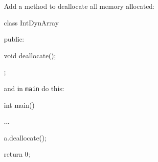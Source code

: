 Add a method to deallocate all memory allocated:



\begin{consolethree}[escapeinside=||]

class IntDynArray

{

public:

    void deallocate();

};

\end{consolethree}



and in \texttt{main} do this:



\begin{consolethree}[escapeinside=||]

int main()

{

    ...

    a.deallocate();

    return 0;

}

\end{consolethree}

